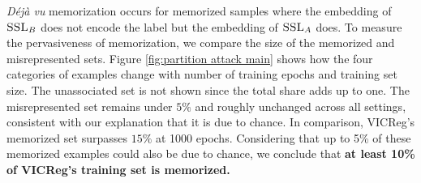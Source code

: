 \emph{Déjà vu} memorization occurs for memorized samples where the embedding of $\textsc{SSL}_B$ does not encode the label but the embedding of $\textsc{SSL}_A$ does. To measure the pervasiveness of \dejavu memorization, we compare the size of the memorized and misrepresented sets.
Figure \ref{fig:partition attack main} shows how the four categories of examples change with number of training epochs and training set size. The unassociated set is not shown since the total share adds up to one. The misrepresented set remains under $5\%$ and roughly unchanged across all settings, consistent with our explanation that it is due to chance. In comparison, VICReg's memorized set surpasses $15\%$ at 1000 epochs. Considering that up to 5\% of these memorized examples could also be due to chance, we conclude that \textbf{at least 10\% of VICReg's training set is \dejavu memorized.} 

